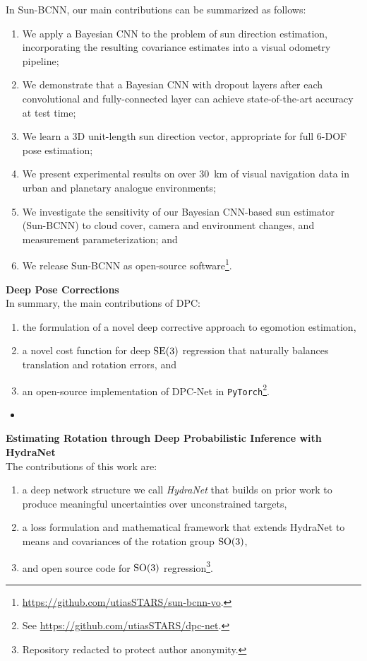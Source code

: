 In Sun-BCNN, our main contributions can be summarized as follows:
\begin{enumerate}
\item We apply a Bayesian CNN to the problem of sun direction estimation, incorporating the resulting covariance estimates into a visual odometry pipeline; 
\item We demonstrate that a Bayesian CNN with dropout layers after each convolutional and fully-connected layer can achieve state-of-the-art accuracy at test time;
\item We learn a 3D unit-length sun direction vector, appropriate for full 6-DOF pose estimation;
\item We present experimental results on over 30~km of visual navigation data in urban \citep{Geiger2012-fq} and planetary analogue \citep{Furgale2012-kk} environments; 
\item We investigate the sensitivity of our Bayesian CNN-based sun estimator (Sun-BCNN) to cloud cover, camera and environment changes, and measurement parameterization; and
\item We release Sun-BCNN as open-source software\footnote{\url{https://github.com/utiasSTARS/sun-bcnn-vo}.}.
\end{enumerate}


\textbf{Deep Pose Corrections} \\
In summary, the main contributions of DPC:
\begin{enumerate}
	\item the formulation of a novel deep corrective approach to egomotion estimation,
	\item a novel cost function for deep $\mathrm{SE}(3)$ regression that naturally balances translation and rotation errors, and
	\item an open-source implementation of DPC-Net in \texttt{PyTorch}\footnote{See \url{https://github.com/utiasSTARS/dpc-net}.}.
\end{enumerate}

\begin{itemize}
	\item {}
\end{itemize}



\textbf{Estimating Rotation through Deep Probabilistic Inference with HydraNet} \\

The contributions of this work are:

\begin{enumerate}
\item a deep network structure we call \textit{HydraNet} that builds on prior work \cite{Lakshminarayanan2017,Osband2016} to produce meaningful uncertainties over unconstrained targets,
\item a loss formulation and mathematical framework that extends HydraNet to means and covariances of the rotation group $\mathrm{SO}(3)$,
\item and open source code for $\mathrm{SO}(3)$ regression\footnote{Repository redacted to protect author anonymity.}.
\end{enumerate}

